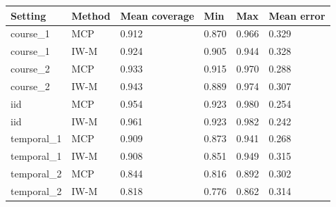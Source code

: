 \begin{tabular}{llllll}
\toprule
Setting & Method & Mean coverage & Min & Max & Mean error\\
\midrule
course\_1 & MCP & 0.912 & 0.870 & 0.966 & 0.329\\
course\_1 & IW-M & 0.924 & 0.905 & 0.944 & 0.328\\
course\_2 & MCP & 0.933 & 0.915 & 0.970 & 0.288\\
course\_2 & IW-M & 0.943 & 0.889 & 0.974 & 0.307\\
iid & MCP & 0.954 & 0.923 & 0.980 & 0.254\\
iid & IW-M & 0.961 & 0.923 & 0.982 & 0.242\\
temporal\_1 & MCP & 0.909 & 0.873 & 0.941 & 0.268\\
temporal\_1 & IW-M & 0.908 & 0.851 & 0.949 & 0.315\\
temporal\_2 & MCP & 0.844 & 0.816 & 0.892 & 0.302\\
temporal\_2 & IW-M & 0.818 & 0.776 & 0.862 & 0.314\\
\bottomrule
\end{tabular}